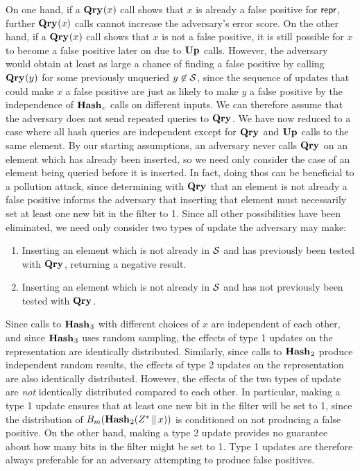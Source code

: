 On one hand, if a $\textup{\textbf{Qry}}\hspace{0.5pt}(x)$ call shows that $x$ is already a false positive for $\mathsf{repr}$, further $\textup{\textbf{Qry}}\hspace{0.5pt}(x)$ calls cannot increase the adversary's error score. On the other hand, if a $\textup{\textbf{Qry}}\hspace{0.5pt}(x)$ call shows that $x$ is not a false positive, it is still possible for $x$ to become a false positive later on due to $\textup{\textbf{Up}}\hspace{0.5pt}$ calls. However, the adversary would obtain at least as large a chance of finding a false positive by calling $\textup{\textbf{Qry}}\hspace{0.5pt}(y)$ for some previously unqueried $y \not\in\mathcal{S}$, since the sequence of updates that could make $x$ a false positive are just as likely to make $y$ a false positive by the independence of $\textup{\textbf{Hash}}\hspace{0.5pt}_c$ calls on different inputs. We can therefore assume that the adversary does not send repeated queries to $\textup{\textbf{Qry}}\hspace{0.5pt}$.
%
We have now reduced to a case where all hash queries are independent except for $\textup{\textbf{Qry}}\hspace{0.5pt}$ and $\textup{\textbf{Up}}\hspace{0.5pt}$ calls to the same element. By our starting assumptions, an adversary never calls $\textup{\textbf{Qry}}\hspace{0.5pt}$ on an element which has already been inserted, so we need only consider the case of an element being queried before it is inserted. In fact, doing thos can be beneficial to a pollution attack, since determining with $\textup{\textbf{Qry}}\hspace{0.5pt}$ that an element is not already a false positive informs the adversary that inserting that element must necessarily set at least one new bit in the filter to 1. Since all other possibilities have been eliminated, we need only consider two types of update the adversary may make:
\begin{enumerate}
  \item Inserting an element which is not already in $\mathcal{S}$ and has previously been tested with $\textup{\textbf{Qry}}\hspace{0.5pt}$, returning a negative result.
  \item Inserting an element which is not already in $\mathcal{S}$ and has not previously been tested with $\textup{\textbf{Qry}}\hspace{0.5pt}$.
\end{enumerate}
Since calls to $\textup{\textbf{Hash}}\hspace{0.5pt}_3$ with different choices of $x$ are independent of each other, and since $\textup{\textbf{Hash}}\hspace{0.5pt}_3$ uses random sampling, the effects of type 1 updates on the representation are identically distributed. Similarly, since calls to $\textup{\textbf{Hash}}\hspace{0.5pt}_2$ produce independent random results, the effects of type 2 updates on the representation are also identically distributed. However, the effects of the two types of update are \emph{not} identically distributed compared to each other. In particular, making a type 1 update ensures that at least one new bit in the filter will be set to 1, since the distribution of ${B}_m(\textup{\textbf{Hash}}\hspace{0.5pt}_2(Z^* \, \| \, x))$ is conditioned on not producing a false positive. On the other hand, making a type 2 update provides no guarantee about how many bits in the filter might be set to 1. Type 1 updates are therefore always preferable for an adversary attempting to produce false positives.

